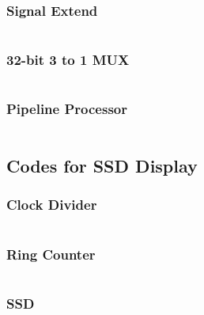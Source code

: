 \documentclass{article}[12pt]
\begin{document}
		\subsubsection{Signal Extend}
			\inputminted{verilog}{pipeline/SignExtend.v}
		\subsubsection{32-bit 3 to 1 MUX}
			\inputminted{verilog}{pipeline/threetwonemux32.v}
		\subsubsection{Pipeline Processor}
			\inputminted{verilog}{pipeline/PipelinedProcessor.v}
		
	\newpage
	\subsection{Codes for SSD Display}
		\subsubsection{Clock Divider}
			\inputminted{verilog}{pipeline/Clockdivider.v}
		\subsubsection{Ring Counter}
			\inputminted{verilog}{pipeline/Ringcounter.v}
		\subsubsection{SSD}
			\inputminted{verilog}{pipeline/SSDfour.v}
				
			
\end{document}

